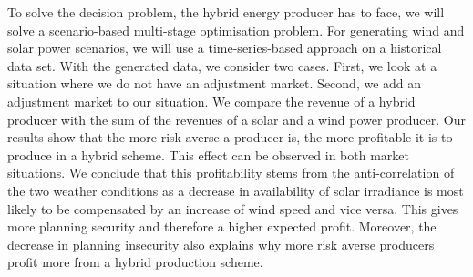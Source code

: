 To solve the  decision problem, the hybrid energy producer has to face, we will solve a scenario-based multi-stage optimisation problem. For generating wind and solar power scenarios, we will use a time-series-based approach on a historical data set. With the generated data, we consider two cases. First, we look at a situation where we do not have an adjustment market. Second, we add an adjustment market to our situation. We compare the revenue of a hybrid producer with the sum of the revenues of a solar and a wind power producer. Our results show that the more risk averse a producer is, the more profitable it is to produce in a hybrid scheme. This effect can be observed in both market situations. We conclude that this profitability stems from the anti-correlation of the two weather conditions as a decrease in availability of solar irradiance is most likely to be compensated by an increase of wind speed and vice versa. This gives more planning security and therefore a higher expected profit. Moreover, the decrease in planning insecurity also explains why more risk averse producers profit more from a hybrid production scheme.  
